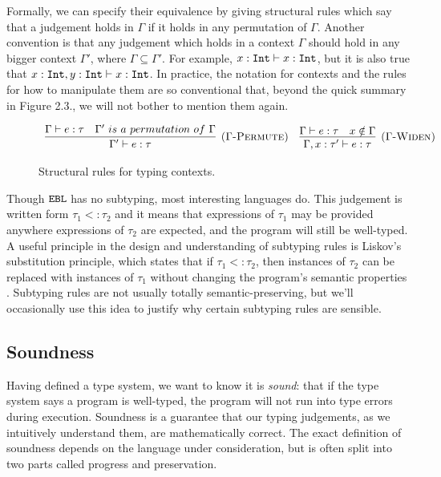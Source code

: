 Formally, we can specify their equivalence by giving structural rules which say that a judgement holds in $\Gamma$ if it holds in any permutation of $\Gamma$. Another convention is that any judgement which holds in a context $\Gamma$ should hold in any bigger context $\Gamma'$, where $\Gamma \subseteq \Gamma'$. For example, $x: \mathtt{Int} \vdash x: \mathtt{Int}$, but it is also true that $x: \mathtt{Int}, y: \mathtt{Int} \vdash x: \mathtt{Int}$. In practice, the notation for contexts and the rules for how to manipulate them are so conventional that, beyond the quick summary in Figure 2.3., we will not bother to mention them again.

\begin{figure}[h]

\noindent
{}

\[
\begin{array}{c}

\infer[\textsc{($\Gamma$-Permute)}]
	{\Gamma' \vdash e: \tau}
	{\Gamma \vdash e: \tau & \Gamma'~is~a~permutation~of~\Gamma}
	~~~
\infer[\textsc{($\Gamma$-Widen)}]
	{\Gamma, x: \tau' \vdash e: \tau }
	{\Gamma \vdash e: \tau & x \notin \Gamma}

	
\end{array}
\]

\vspace{-12pt}
\caption{Structural rules for typing contexts.}
\label{A sample. }
\end{figure}

Though $\mathtt{EBL}$ has no subtyping, most interesting languages do. This judgement is written form $\tau_1 <: \tau_2$ and it means that expressions of $\tau_1$ may be provided anywhere expressions of $\tau_2$ are expected, and the program will still be well-typed. A useful principle in the design and understanding of subtyping rules is Liskov's substitution principle, which states that if $\tau_1 <: \tau_2$, then instances of $\tau_2$ can be replaced with instances of $\tau_1$ without changing the program's semantic properties \cite{liskov87}. Subtyping rules are not usually totally semantic-preserving, but we'll occasionally use this idea to justify why certain subtyping rules are sensible.

\subsection{Soundness}

Having defined a type system, we want to know it is \textit{sound}: that if the type system says a program is well-typed, the program will not run into type errors during execution. Soundness is a guarantee that our typing judgements, as we intuitively understand them, are mathematically correct. The exact definition of soundness depends on the language under consideration, but is often split into two parts called progress and preservation.

